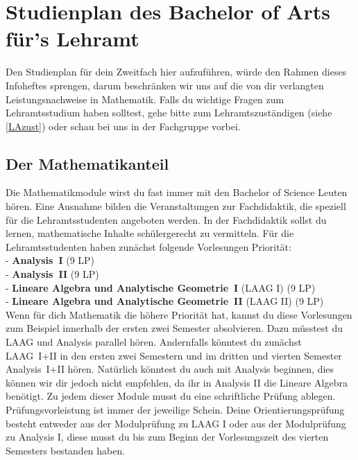 \newpage
\section{Studienplan des Bachelor of Arts für's Lehramt}\label{LA}

Den Studienplan für dein Zweitfach hier aufzuführen,
würde den Rahmen dieses Infoheftes sprengen,
darum beschränken wir uns auf die
von dir verlangten Leistungsnachweise in Mathematik.
Falls du wichtige Fragen zum Lehramtsstudium haben solltest,
gehe bitte zum Lehramtszuständigen (siehe \ref{LAzust})
oder schau bei uns in der Fachgruppe vorbei.

\subsection{Der Mathematikanteil}
Die Mathematikmodule wirst du fast immer mit den Bachelor of Science Leuten hören. 
Eine Ausnahme bilden die Veranstaltungen zur Fachdidaktik,
die speziell für die Lehramtsstudenten angeboten werden.
In der Fachdidaktik sollst du lernen,
mathematische Inhalte schülergerecht zu vermitteln.
Für die Lehramtsstudenten haben zunächst folgende Vorlesungen Priorität:\\[6pt]
- {\bf Analysis~I} (9 LP)\\[2pt]
- {\bf Analysis~II} (9 LP)\\[2pt]
- {\bf Lineare Algebra und Analytische Geometrie~I} (LAAG I) (9 LP)\\[2pt]
- {\bf Lineare Algebra und Analytische Geometrie~II} (LAAG II) (9 LP)\\[6pt]
Wenn für dich Mathematik die höhere Priorität hat,
kannst du diese Vorlesungen zum Beispiel
innerhalb der ersten zwei Semester absolvieren.
Dazu müsstest du LAAG und Analysis parallel hören.
Andernfalls könntest du zunächst LAAG~I+II in den ersten zwei Semestern
und im dritten und vierten Semester Analysis~I+II hören.
Natürlich könntest du auch mit Analysis beginnen,
dies können wir dir jedoch nicht empfehlen,
da ihr in Analysis II die Lineare Algebra benötigt. 
Zu jedem dieser Module musst du eine schriftliche Prüfung ablegen.
Prüfungsvorleistung ist immer der jeweilige Schein.
Deine Orientierungsprüfung besteht
entweder aus der Modulprüfung zu LAAG I oder aus der Modulprüfung zu Analysis I,
diese musst du bis zum Beginn der Vorlesungszeit
des vierten Semesters bestanden haben.

